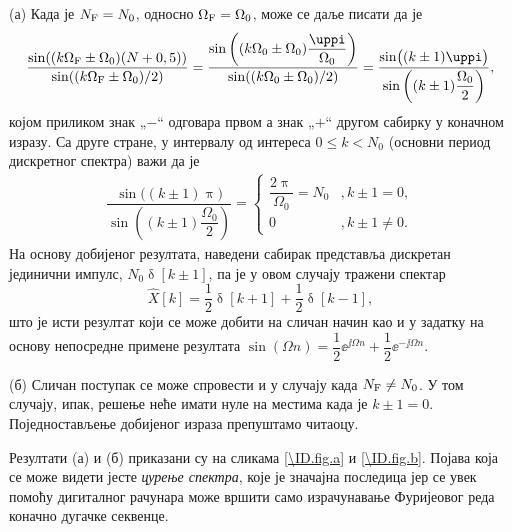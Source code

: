 (а) Када је $N_{\rm F} = N_0$, односно $\Omega_{\rm F} = \Omega_0$, може се даље писати да је 
\begin{eqnarray}
    \dfrac{\sin( (k \Omega_{\rm F} \pm \Omega_0)(N + 0,5) ) }{ \sin((k \Omega_{\rm F} \pm \Omega_0)/2) }
    = 
    \dfrac{\sin \left( (k \Omega_{\rm 0} \pm \Omega_0) \dfrac{\uppi}{\Omega_0} \right) }{ \sin((k \Omega_{\rm 0} \pm \Omega_0)/2) } 
    = \dfrac{ \sin \bigl( (k \pm 1)\uppi \bigr) }{ \sin \left( (k \pm 1)\dfrac{\Omega_0}2 \right)},
\end{eqnarray}
којом приликом знак „$-$“ одговара првом а знак „$+$“ другом сабирку у коначном изразу.
Са друге стране, у интервалу од интереса $ 0 \leq k < N_{0}$ (основни период дискретног спектра) важи да је 
\begin{eqnarray}
    \dfrac{ \sin \bigl( (k \pm 1)\uppi \bigr) }{ \sin \left( (k \pm 1)\dfrac{\Omega_0}2 \right)} = 
    \begin{cases}
        \dfrac{2\uppi}{\Omega_0} = N_0 &, k \pm 1 = 0, \\
        0 &, k \pm 1 \neq 0.
    \end{cases}
\end{eqnarray}
На основу добијеног резултата, наведени сабирак представља дискретан јединични импулс, 
$N_0 \updelta[k \pm 1]$, па је у овом случају тражени спектар
\begin{equation}
    \hat X[k] = \dfrac{1}{2}\updelta[k + 1] + \dfrac{1}{2}\updelta[k - 1],
\end{equation}
што је исти резултат који се може добити на сличан начин као и у задатку  на основу непосредне примене резултата
$\sin({\Omega n}) = \dfrac{1}{2} \ee^{\jj\Omega n} + \dfrac{1}{2} \ee^{-\jj\Omega n}$.

(б) Сличан поступак се може спровести и у случају када $N_{\rm F} \neq N_0$. У том случају, ипак, решење неће имати нуле на местима када је 
$k \pm 1 = 0$. Поједностављење добијеног израза препуштамо читаоцу. 

Резултати (а) и (б) приказани су на сликама \ref{\ID.fig.a} и \ref{\ID.fig.b}. 
Појава која се може видети јесте \textit{цурење спектра}, које је значајна последица јер се увек помоћу дигиталног рачунара 
може вршити само израчунавање Фуријеовог реда коначно дугачке секвенце.


